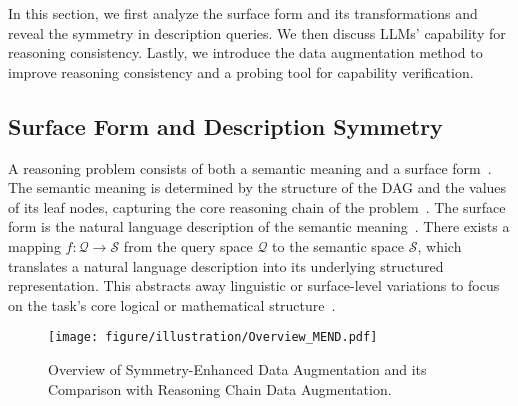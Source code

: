 

\label{section: method}
In this section, we first analyze the surface form and its transformations and reveal the symmetry in description queries. We then discuss LLMs' capability for reasoning consistency. Lastly, we introduce the data augmentation method to improve reasoning consistency and a probing tool for capability verification.



\subsection{Surface Form and Description Symmetry}
A reasoning problem consists of both a semantic meaning and a surface form~\citep{zhou2024paraphrase}. The semantic meaning is determined by the structure of the DAG and the values of its leaf nodes, capturing the core reasoning chain of the problem~\citep{pearl2009causality, velickovic2018geometric}. 
The surface form is the natural language description of the semantic meaning~\citep{zhou2024paraphrase}.
There exists a mapping \( f: \mathcal{Q} \to \mathcal{S} \) from the query space \( \mathcal{Q} \) to the semantic space \( \mathcal{S} \), which translates a natural language description into its underlying structured representation. This abstracts away linguistic or surface-level variations to focus on the task's core logical or mathematical structure~\cite{russell2021ai}. 

\begin{figure}[t]
    \centering
    \texttt{[image: figure/illustration/Overview\_MEND.pdf]}
    \caption{Overview of Symmetry-Enhanced Data Augmentation and its Comparison with Reasoning Chain Data Augmentation.}
    \label{fig: illustration}
    \vspace{-4mm}
\end{figure}

